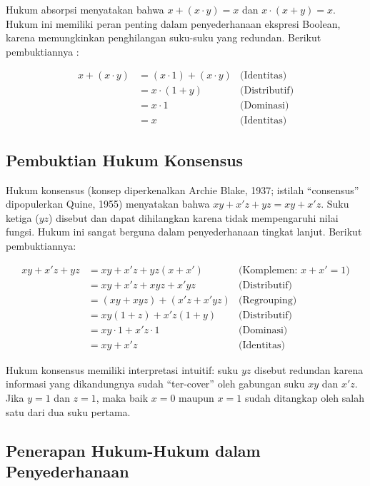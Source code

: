 Hukum absorpsi menyatakan bahwa $x + (x \cdot y) = x$ dan $x \cdot (x + y) = x$. Hukum ini memiliki peran penting dalam penyederhanaan ekspresi Boolean, karena memungkinkan penghilangan suku-suku yang redundan. Berikut pembuktiannya \cite{rosen2019}:

\begin{align*}
x + (x \cdot y) &= (x \cdot 1) + (x \cdot y) & \text{(Identitas)} \\
                 &= x \cdot (1 + y) & \text{(Distributif)} \\
                 &= x \cdot 1 & \text{(Dominasi)} \\
                 &= x & \text{(Identitas)}
\end{align*}

\subsection{Pembuktian Hukum Konsensus}

Hukum konsensus (konsep diperkenalkan Archie Blake, 1937; istilah ``consensus'' dipopulerkan Quine, 1955) menyatakan bahwa $xy + x'z + yz = xy + x'z$. Suku ketiga ($yz$) disebut  dan dapat dihilangkan karena tidak mempengaruhi nilai fungsi. Hukum ini sangat berguna dalam penyederhanaan tingkat lanjut. Berikut pembuktiannya:

\begin{align*}
xy + x'z + yz &= xy + x'z + yz(x + x') & \text{(Komplemen: } x + x' = 1) \\
              &= xy + x'z + xyz + x'yz & \text{(Distributif)} \\
              &= (xy + xyz) + (x'z + x'yz) & \text{(Regrouping)} \\
              &= xy(1 + z) + x'z(1 + y) & \text{(Distributif)} \\
              &= xy \cdot 1 + x'z \cdot 1 & \text{(Dominasi)} \\
              &= xy + x'z & \text{(Identitas)}
\end{align*}

\begin{konsep}
Hukum konsensus memiliki interpretasi intuitif: suku $yz$ disebut redundan karena informasi yang dikandungnya sudah ``ter-cover'' oleh gabungan suku $xy$ dan $x'z$. Jika $y = 1$ dan $z = 1$, maka baik $x = 0$ maupun $x = 1$ sudah ditangkap oleh salah satu dari dua suku pertama.
\end{konsep}

\subsection{Penerapan Hukum-Hukum dalam Penyederhanaan}


